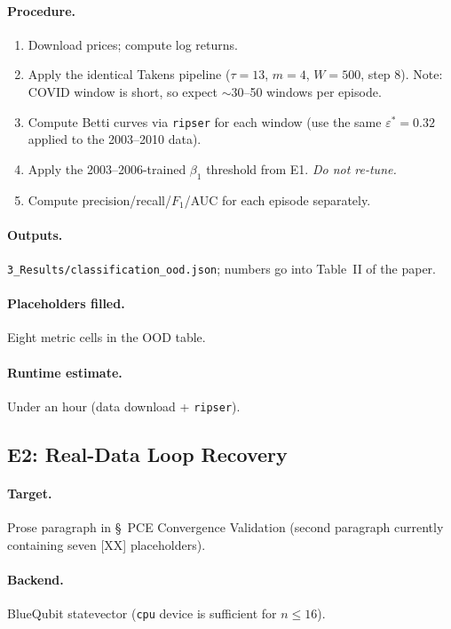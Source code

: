 \documentclass[11pt]{article}
\begin{document}
\paragraph*{Procedure.}
\begin{enumerate}[leftmargin=*]
  \item Download prices; compute log returns.
  \item Apply the identical Takens pipeline ($\tau=13$, $m=4$, $W=500$,
        step 8). Note: COVID window is short, so expect $\sim$30--50
        windows per episode.
  \item Compute Betti curves via \texttt{ripser} for each window (use
        the same $\varepsilon^*=0.32$ applied to the 2003--2010 data).
  \item Apply the 2003--2006-trained $\beta_1$ threshold from E1.
        \emph{Do not re-tune.}
  \item Compute precision/recall/$F_1$/AUC for each episode
        separately.
\end{enumerate}

\paragraph*{Outputs.}
\texttt{3\_Results/classification\_ood.json}; numbers go into
Table~II of the paper.

\paragraph*{Placeholders filled.} Eight metric cells in the OOD
table.

\paragraph*{Runtime estimate.} Under an hour (data download +
\texttt{ripser}).

\subsection{E2: Real-Data Loop Recovery}

\paragraph*{Target.} Prose paragraph in \S~PCE Convergence
Validation (second paragraph currently containing seven [XX]
placeholders).

\paragraph*{Backend.} BlueQubit statevector (\texttt{cpu} device is
sufficient for $n \leq 16$).
\end{document}
